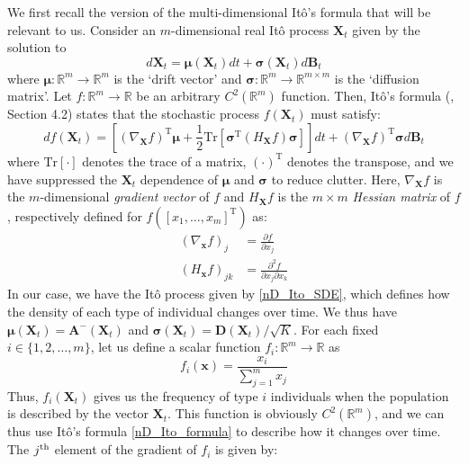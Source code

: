We first recall the version of the multi-dimensional It\^{o}'s formula that will be relevant to us. Consider an $m$-dimensional real It\^{o} process $\mathbf{X}_t$ given by the solution to
\begin{equation*}
d\mathbf{X}_t = \boldsymbol{\mu}(\mathbf{X}_t)dt + \boldsymbol{\sigma}(\mathbf{X}_t)d\mathbf{B}_t
\end{equation*}
where $\boldsymbol{\mu}: \mathbb{R}^m \to \mathbb{R}^m$ is the `drift vector' and $\boldsymbol{\sigma}: \mathbb{R}^{m} \to \mathbb{R}^{m \times m}$ is the `diffusion matrix'. Let $f: \mathbb{R}^m \to \mathbb{R}$ be an arbitrary $C^2(\mathbb{R}^m)$ function. Then, It\^{o}'s formula (\cite{oksendal_stochastic_1998}, Section 4.2) states that  the stochastic process $f(\mathbf{X}_t)$ must satisfy:
\begin{equation}
\label{nD_Ito_formula}
df(\mathbf{X}_t) = \left[\left(\nabla_{\mathbf{X}}f\right)^{\mathrm{T}}\boldsymbol{\mu} + \frac{1}{2}\mathrm{Tr}[\boldsymbol{\sigma}^{\mathrm{T}}(H_{\mathbf{X}}f)\boldsymbol{\sigma}]\right]dt + \left(\nabla_{\mathbf{X}}f\right)^{\mathrm{T}}\boldsymbol{\sigma}d\mathbf{B}_t
\end{equation}
where $\mathrm{Tr}[\cdot]$ denotes the trace of a matrix, $\left(\cdot\right)^{\mathrm{T}}$ denotes the transpose, and we have suppressed the $\mathbf{X}_t$ dependence of $\boldsymbol{\mu}$ and $\boldsymbol{\sigma}$ to reduce clutter. Here, $\nabla_{\mathbf{X}}f$ is the $m$-dimensional \emph{gradient vector} of $f$ and $H_{\mathbf{X}}f$ is the $m \times m$ \emph{Hessian matrix} of $f$, respectively defined for $f([x_1,\ldots,x_m]^{\mathrm{T}})$ as:
\begin{align*}
\left(\nabla_{\mathbf{x}} f\right)_j &= \frac{\partial f}{\partial x_j}\\
\left(H_{\mathbf{x}} f\right)_{jk} &= \frac{\partial^2 f}{\partial x_j \partial x_k } 
\end{align*}
In our case, we have the It\^{o} process given by \eqref{nD_Ito_SDE}, which defines how the density of each type of individual changes over time. We thus have $\boldsymbol{\mu}(\mathbf{X}_t) = \mathbf{A}^{-}(\mathbf{X}_t)$ and $\boldsymbol{\sigma}(\mathbf{X}_t) = \mathbf{D}(\mathbf{X}_t)/\sqrt{K}$.  For each fixed $i \in \{1,2,\ldots,m\}$, let us define a scalar function $f_i: \mathbb{R}^m \to \mathbb{R}$ as
\begin{equation*}
f_i(\mathbf{x}) = \frac{x_i}{\sum\limits_{j=1}^{m}x_j}
\end{equation*}
Thus, $f_i(\mathbf{X}_t)$ gives us the frequency of type $i$ individuals when the population is described by the vector $\mathbf{X}_t$. This function is obviously $C^2(\mathbb{R}^m)$, and we can thus use It\^{o}'s formula \eqref{nD_Ito_formula} to describe how it changes over time. The $j\textsuperscript{th}$ element of the gradient of $f_i$ is given by:
